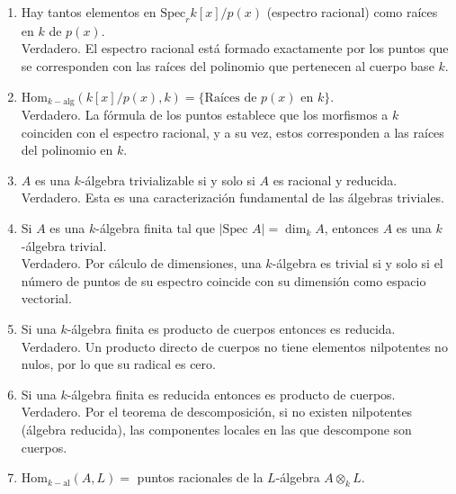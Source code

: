 \begin{enumerate}
    Verdadero. Los ideales primos de un producto directo residen completamente en uno de los dos factores, dando lugar a una unión disjunta de sus espectros. En un producto de anillos $A \times B$, los elementos $(1,0)$ y $(0,1)$ cumplen que su producto es $(0,0)$. Como cualquier ideal primo debe contener al $(0,0)$, si el ideal es primo debe contener o bien al $(1,0)$ o bien al $(0,1)$. Esto fuerza a que los ideales primos vivan completamente en el primer factor (teniendo la forma $\mathfrak{p} \times B$) o en el segundo ($A \times \mathfrak{q}$). Geométricamente, el espacio de soluciones es la unión disjunta de los dos espacios.
    \item Hay tantos elementos en $\text{Spec}_{r} k[x]/p(x)$ (espectro racional) como raíces en $k$ de $p(x)$. \\ 
    Verdadero. El espectro racional está formado exactamente por los puntos que se corresponden con las raíces del polinomio que pertenecen al cuerpo base $k$.
    \item $\text{Hom}_{k-\text{alg}}(k[x]/p(x),k) = \{\text{Raíces de } p(x) \text{ en } k\}$.\\
    Verdadero. La fórmula de los puntos establece que los morfismos a $k$ coinciden con el espectro racional, y a su vez, estos corresponden a las raíces del polinomio en $k$.
    \item $A$ es una $k$-álgebra trivializable si y solo si $A$ es racional y reducida. \\
    Verdadero. Esta es una caracterización fundamental de las álgebras triviales.
    \item Si $A$ es una $k$-álgebra finita tal que $|\text{Spec } A| = \dim_{k}A$, entonces $A$ es una $k$-álgebra trivial. \\
    Verdadero. Por cálculo de dimensiones, una $k$-álgebra es trivial si y solo si el número de puntos de su espectro coincide con su dimensión como espacio vectorial.
    \item Si una $k$-álgebra finita es producto de cuerpos entonces es reducida. \\
    Verdadero. Un producto directo de cuerpos no tiene elementos nilpotentes no nulos, por lo que su radical es cero.
    \item Si una $k$-álgebra finita es reducida entonces es producto de cuerpos. \\
    Verdadero. Por el teorema de descomposición, si no existen nilpotentes (álgebra reducida), las componentes locales en las que descompone son cuerpos.
    \item $\text{Hom}_{k-\text{al}}(A,L) = $ puntos racionales de la $L$-álgebra $A\otimes_{k}L$. \\

\end{enumerate}

